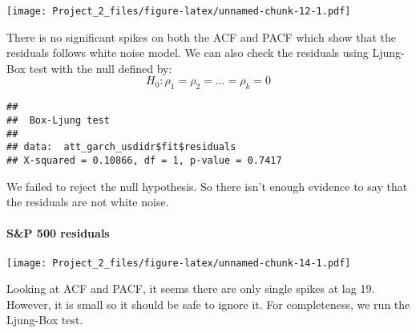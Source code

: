\documentclass[]{article}
\newenvironment{Shaded}{\begin{snugshade}}{\end{snugshade}}
\newcommand{\KeywordTok}[1]{\textcolor[rgb]{0.13,0.29,0.53}{\textbf{#1}}}
\newcommand{\DataTypeTok}[1]{\textcolor[rgb]{0.13,0.29,0.53}{#1}}
\newcommand{\StringTok}[1]{\textcolor[rgb]{0.31,0.60,0.02}{#1}}
\newcommand{\OperatorTok}[1]{\textcolor[rgb]{0.81,0.36,0.00}{\textbf{#1}}}
\newcommand{\NormalTok}[1]{#1}
\let\oldparagraph\paragraph
\renewcommand{\paragraph}[1]{\oldparagraph{#1}\mbox{}}
\begin{document}
\begin{Shaded}
\end{Shaded}

\texttt{[image: Project\_2\_files/figure-latex/unnamed-chunk-12-1.pdf]}

There is no significant spikes on both the ACF and PACF which show that
the residuals follows white noise model. We can also check the residuals
using Ljung-Box test with the null defined by:
\[H_{0}:\rho_{1}=\rho_{2}=...=\rho_{k}=0\]

\begin{Shaded}
\end{Shaded}

\begin{verbatim}
## 
##  Box-Ljung test
## 
## data:  att_garch_usdidr$fit$residuals
## X-squared = 0.10866, df = 1, p-value = 0.7417
\end{verbatim}

We failed to reject the null hypothesis. So there isn't enough evidence
to say that the residuals are not white noise.

\paragraph{S\&P 500 residuals}\label{sp-500-residuals}

\begin{Shaded}
\end{Shaded}

\texttt{[image: Project\_2\_files/figure-latex/unnamed-chunk-14-1.pdf]}

Looking at ACF and PACF, it seems there are only single spikes at lag
19. However, it is small so it should be safe to ignore it. For
completeness, we run the Ljung-Box test.
\end{document}
